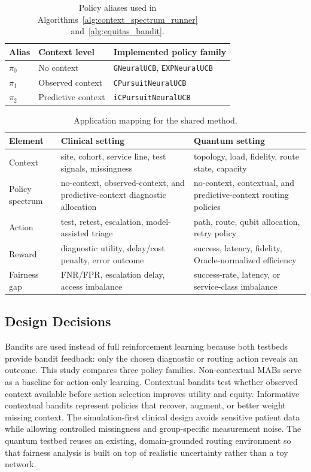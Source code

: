 \documentclass[conference]{IEEEtran}
\begin{document}
\begin{table}[t]
\caption{Policy aliases used in Algorithms~\ref{alg:context_spectrum_runner} and~\ref{alg:equitas_bandit}.}
\label{tab:policy_aliases}
\centering
\small
\begin{tabular}{p{}p{}p{}}
\toprule
\textbf{Alias} & \textbf{Context level} & \textbf{Implemented policy family} \\
\midrule
$\pi_0$ & No context & \texttt{GNeuralUCB}, \texttt{EXPNeuralUCB} \\
$\pi_1$ & Observed context & \texttt{CPursuitNeuralUCB} \\
$\pi_2$ & Predictive context & \texttt{iCPursuitNeuralUCB} \\
\bottomrule
\end{tabular}
\end{table}

\begin{table}[t]
\caption{Application mapping for the shared method.}
\label{tab:application_mapping}
\centering
\small
\begin{tabular}{p{}p{}p{}}
\toprule
\textbf{Element} & \textbf{Clinical setting} & \textbf{Quantum setting} \\
\midrule
Context & site, cohort, service line, test signals, missingness & topology, load, fidelity, route state, capacity \\
Policy spectrum & no-context, observed-context, and predictive-context diagnostic allocation & no-context, contextual, and predictive-context routing policies \\
Action & test, retest, escalation, model-assisted triage & path, route, qubit allocation, retry policy \\
Reward & diagnostic utility, delay/cost penalty, error outcome & success, latency, fidelity, Oracle-normalized efficiency \\
Fairness gap & FNR/FPR, escalation delay, access imbalance & success-rate, latency, or service-class imbalance \\
\bottomrule
\end{tabular}
\end{table}

\subsection{Design Decisions}
Bandits are used instead of full reinforcement learning because both testbeds
provide bandit feedback: only the chosen diagnostic or routing action reveals
an outcome. This study compares three policy families. Non-contextual MABs
serve as a baseline for action-only learning. Contextual bandits test whether
observed context available before action selection improves utility and equity.
Informative contextual bandits represent policies that recover, augment, or
better weight missing context.
The simulation-first clinical design avoids sensitive patient data while
allowing controlled missingness and group-specific measurement noise. The
quantum testbed reuses an existing, domain-grounded routing environment so
that fairness analysis is built on top of realistic uncertainty rather than
a toy network.
\end{document}
